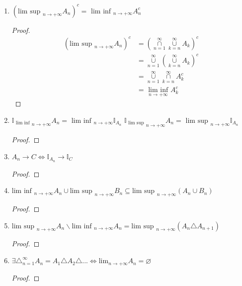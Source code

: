 \documentclass[letterpaper, 12pt]{article}
\newcommand{\1}{\mathds{1}}	%
\theoremstyle{definition}
\begin{document}
{
\begin{enumerate}
    \item $(\text{lim sup }_{n \to +\infty} A_n)^c = \text{ lim inf }_{n \to +\infty} A^{c}_{n}$
    \begin{proof}
        \begin{align*}
        (\text{lim sup }_{n \to +\infty} A_n)^c &= (\overset{\infty}{ \underset{n=1}{\cap}} \overset{\infty}{ \underset{k=n}{\cup}} A_k)^c \\
        &= \overset{\infty}{ \underset{n=1}{\cup}} (\overset{\infty}{ \underset{k=n}{\cup}} A_k)^c \\
        &= \overset{\infty}{ \underset{n=1}{\cup}} \overset{\infty}{ \underset{k=n}{\cap}} A_k^c \\
        &= {\underset{n \to + \infty}{\text{ lim inf }}} A_{k}^c 
        \end{align*}
    \end{proof}
    \item ${\mathds{I}_{\text{ lim inf }}}_{n \to + \infty} A_n = \text{ lim inf }_{n \to + \infty} \mathds{I}_{A_n}$ \newline
    ${\mathds{I}_{\text{ lim sup }}}_{n \to + \infty} A_n = \text{ lim sup }_{n \to + \infty} \mathds{I}_{A_n}$
    \begin{proof}
        
    \end{proof}
    \item $A_n \to C \Longleftrightarrow \mathds{I}_{A_n} \to \mathds{I}_{C}$
    \begin{proof}
        
    \end{proof}
    \item $\text{lim inf }_{n \to + \infty} A_n \cup  \text{lim sup }_{n \to + \infty} B_n \subseteq \text{lim sup }_{n \to + \infty} (A_n \cup B_n)$
    \begin{proof}
    
    \end{proof}
    \item $\text{lim sup }_{n \to + \infty} A_n \backslash \text{lim inf }_{n \to + \infty} A_n = \text{lim sup }_{n \to + \infty} (A_n \triangle A_{n+1}) $
    \begin{proof}
        
    \end{proof}
    \item $\exists \triangle^{\infty}_{n = 1} A_n = A_1 \triangle A_2 \triangle ... \Longleftrightarrow \text{lim}_{n \to + \infty} A_n = \varnothing$
    \begin{proof}
        

\end{proof}
\end{enumerate}}
\end{document}
